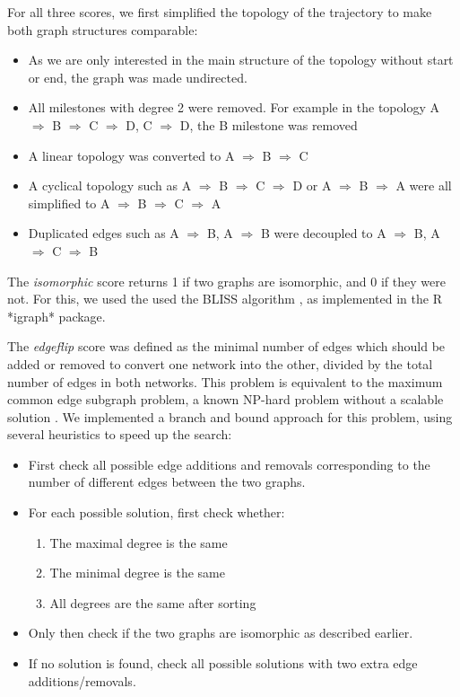 For all three scores, we first simplified the topology of the trajectory to make both graph structures comparable:

\begin{itemize}
	\item As we are only interested in the main structure of the topology without start or end, the graph was made undirected.
	\item All milestones with degree 2 were removed. For example in the topology A $\Rightarrow$ B $\Rightarrow$ C $\Rightarrow$ D, C $\Rightarrow$ D, the B milestone was removed
	\item A linear topology was converted to A $\Rightarrow$ B $\Rightarrow$ C
	\item A cyclical topology such as A $\Rightarrow$ B $\Rightarrow$ C $\Rightarrow$ D or A $\Rightarrow$ B $\Rightarrow$ A were all simplified to A $\Rightarrow$ B $\Rightarrow$ C $\Rightarrow$ A
	\item Duplicated edges such as A $\Rightarrow$ B, A $\Rightarrow$ B were decoupled to A $\Rightarrow$ B, A $\Rightarrow$ C $\Rightarrow$ B
\end{itemize}

The \textit{isomorphic} score returns 1 if two graphs are isomorphic, and 0 if they were not. For this, we used the used the BLISS algorithm \cite{junttila_engineeringefficientcanonical_2007}, as implemented in the R *igraph* package.

The \textit{edgeflip} score was defined as the minimal number of edges which should be added or removed to convert one network into the other, divided by the total number of edges in both networks. This problem is equivalent to the maximum common edge subgraph problem, a known NP-hard problem without a scalable solution \cite{bahiense_maximumcommonedge_2012}. We implemented a branch and bound approach for this problem, using several heuristics to speed up the search:

\begin{itemize}
	\item First check all possible edge additions and removals corresponding to the number of different edges between the two graphs.
	\item For each possible solution, first check whether: \begin{enumerate}
		\item The maximal degree is the same
		\item The minimal degree is the same
		\item All degrees are the same after sorting
	\end{enumerate}
	\item Only then check if the two graphs are isomorphic as described earlier.
	\item If no solution is found, check all possible solutions with two extra edge additions/removals.
\end{itemize}

